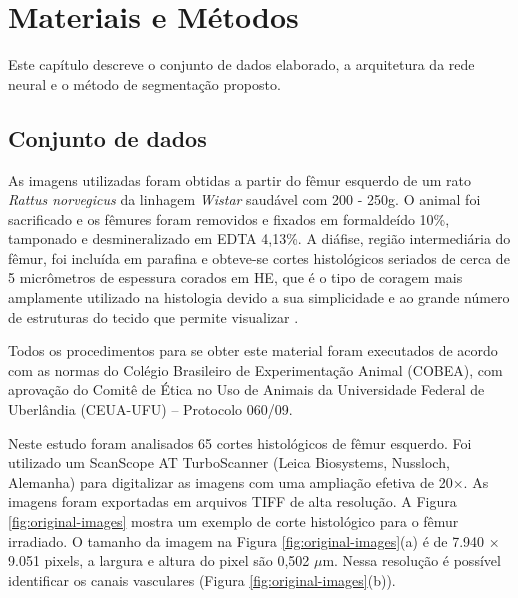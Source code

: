 \chapter[Materiais e Métodos]{Materiais e Métodos}
\label{materiais-e-metodos}

Este capítulo descreve o conjunto de dados elaborado, a arquitetura da rede neural e o método de segmentação proposto.

\section{Conjunto de dados}

As imagens utilizadas foram obtidas a partir do fêmur esquerdo de um rato \textit{Rattus norvegicus} da linhagem \textit{Wistar} saudável com 200 - 250g. O animal foi sacrificado e os fêmures foram removidos e fixados em formaldeído 10\%, tamponado e desmineralizado em EDTA 4,13\%. A diáfise, região intermediária do fêmur, foi incluída em parafina e obteve-se cortes histológicos seriados de cerca de 5 micrômetros de espessura corados em \ac{HE}, que é o tipo de coragem mais amplamente utilizado na histologia devido a sua simplicidade e ao grande número de estruturas do tecido que permite visualizar \cite{feldman2014tissue}. 

Todos os procedimentos para se obter este material foram executados de acordo com as normas do Colégio Brasileiro de Experimentação Animal (COBEA), com aprovação do Comitê de Ética no Uso de Animais da Universidade Federal de Uberlândia (CEUA-UFU) -- Protocolo 060/09.

Neste estudo foram analisados 65 cortes histológicos de fêmur esquerdo. Foi utilizado um ScanScope AT Turbo\textregistered Scanner (Leica Biosystems, Nussloch, Alemanha) para digitalizar as imagens com uma ampliação efetiva de 20×. As imagens foram exportadas em arquivos TIFF de alta resolução. A Figura \ref{fig:original-images} mostra um exemplo de corte histológico para o fêmur irradiado. O tamanho da imagem na Figura \ref{fig:original-images}(a) é de 7.940 × 9.051 pixels, a largura e altura do pixel são 0,502 \(\mu\)m. Nessa resolução é possível identificar os canais vasculares (Figura \ref{fig:original-images}(b)).

